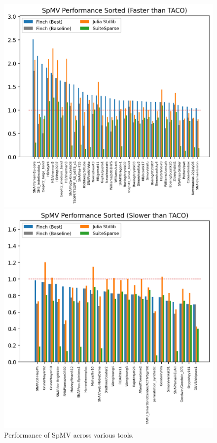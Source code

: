 \begin{figure}
    \begin{minipage}[t]{0.5\textwidth}
        \vspace{0pt} %
        \includegraphics[width=\linewidth]{spmv_performance_sorted_(faster_than_taco).png}
    \end{minipage}%
    \begin{minipage}[t]{0.5\textwidth}
        \vspace{0pt} %
        \includegraphics[width=\linewidth]{spmv_performance_sorted_(slower_than_taco).png}
    \end{minipage}
    \caption{Performance of SpMV across various tools.}
    \label{spmv_sorted}
\end{figure}

